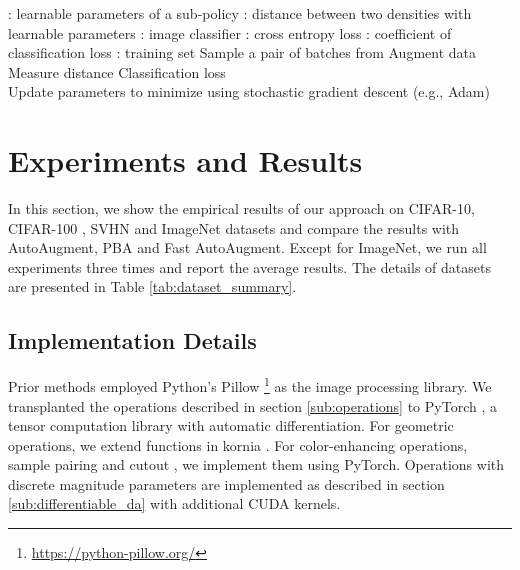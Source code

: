 \documentclass[10pt,twocolumn,letterpaper]{article}
\newcommand{\Tabref}[1]{Table \ref{#1}}
\newcommand{\autoaugment}{AutoAugment\xspace}
\newcommand{\faster}{Faster \autoaugment}
\newcommand{\fast}{Fast \autoaugment}
\begin{document}
\begin{algorithm}
\caption{Training of \faster}
\label{alg:faster_autoaugment}

\begin{algorithmic}
    \Statex : learnable parameters of a sub-policy
    \Statex : distance between two densities with learnable parameters  
    \Statex : image classifier
    \Statex : cross entropy loss
    \Statex : coefficient of classification loss
    \Statex : training set
        \State Sample a pair of batches  from 
        \State Augment data 
        \State Measure distance 
        \State Classification loss \\ 
        \State Update parameters  to minimize  using stochastic gradient descent (e.g., Adam)
    \EndWhile
\end{algorithmic}
\end{algorithm}

\section{Experiments and Results}\label{sec:experiments}

In this section, we show the empirical results of our approach on CIFAR-10, CIFAR-100 \cite{Krizhevsky2009}, SVHN \cite{Netzer2011} and ImageNet \cite{Russakovsky2015} datasets and compare the results with \autoaugment \cite{Cubuk2018}, PBA \cite{Ho2019} and \fast \cite{Lim2019}. Except for ImageNet, we run all experiments three times and report the average results. The details of datasets are presented in \Tabref{tab:dataset_summary}.

\subsection{Implementation Details}

Prior methods \cite{Cubuk2018,Ho2019,Lim2019} employed Python's Pillow \footnote{\url{https://python-pillow.org/}} as the image processing library. We transplanted the operations described in section \ref{sub:operations} to PyTorch \cite{Paszke2017}, a tensor computation library with automatic differentiation. For geometric operations, we extend functions in kornia \cite{eriba2019kornia}. For color-enhancing operations, sample pairing \cite{Inoue} and cutout \cite{DeVries2017}, we implement them using PyTorch. Operations with discrete magnitude parameters are implemented as described in section \ref{sub:differentiable_da} with additional CUDA kernels.
\end{document}
